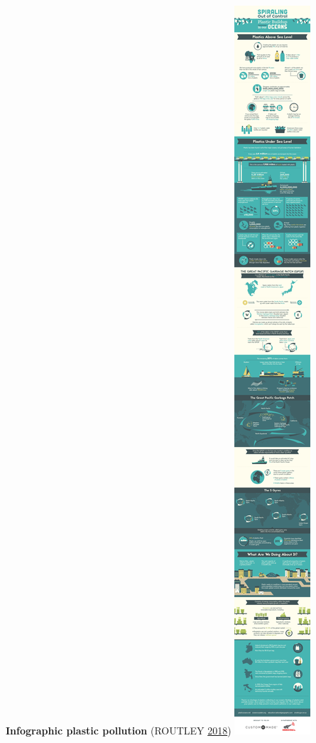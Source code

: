 \documentclass[]{book}
\begin{document}
\textbf{Infographic plastic pollution} (ROUTLEY
\protect\hyperlink{ref-plastic_pollution_infographics}{2018})
\includegraphics{images/infographic-plastic-buildup.jpg}
\end{document}
